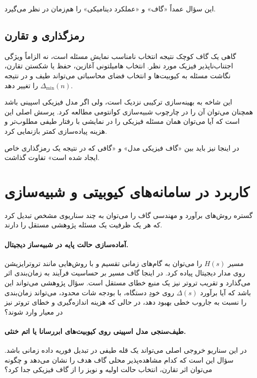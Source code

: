 این سؤال عمداً «گاف» و «عملکرد دینامیکی» را هم‌زمان در نظر می‌گیرد.

\subsection{رمزگذاری و تقارن}

گاهی یک گاف کوچک نتیجه انتخاب نامناسب نمایش مسئله است، نه الزاماً ویژگی اجتناب‌ناپذیر فیزیک مورد نظر.
انتخاب هامیلتونی آغازین، حفظ یا شکستن تقارن، نگاشت مسئله به کیوبیت‌ها و انتخاب فضای محاسباتی می‌تواند طیف و در نتیجه $\Delta_{\min}(n)$ را تغییر دهد.

این شاخه به بهینه‌سازی ترکیبی نزدیک است، ولی اگر مدل فیزیکی اسپینی باشد همچنان می‌توان آن را در چارچوب شبیه‌سازی کوانتومی مطالعه کرد.
پرسش اصلی این است که آیا می‌توان همان مسئله فیزیکی را در نمایشی با رفتار طیفی مطلوب‌تر و هزینه پیاده‌سازی کمتر بازنمایی کرد.

در اینجا نیز باید بین «گاف فیزیکی مدل» و «گافی که در نتیجه یک رمزگذاری خاص ایجاد شده است» تفاوت گذاشت.

\section{کاربرد در سامانه‌های کیوبیتی و شبیه‌سازی}

گستره روش‌های برآورد و مهندسی گاف را می‌توان به چند سناریوی مشخص تبدیل کرد که هر یک ظرفیت یک مسئله پژوهشی مستقل را دارند.

\paragraph{آماده‌سازی حالت پایه در شبیه‌ساز دیجیتال.}
مسیر $H(s)$ را می‌توان به گام‌های زمانی تقسیم و با روش‌هایی مانند تروترایزیشن روی مدار دیجیتال پیاده کرد.
در اینجا گاف مسیر بر حساسیت فرآیند به زمان‌بندی اثر می‌گذارد و تقریب تروتر نیز یک منبع خطای مستقل است.
سؤال پژوهشی می‌تواند این باشد که آیا برآورد $\Delta(s)$ روی خودِ دستگاه، با بودجه شات محدود، می‌تواند زمان‌بندی را نسبت به جاروب خطی بهبود دهد، در حالی که هزینه اندازه‌گیری و خطای تروتر نیز در معیار وارد شوند؟

\paragraph{طیف‌سنجی مدل اسپینی روی کیوبیت‌های ابررسانا یا اتم خنثی.}
در این سناریو خروجی اصلی می‌تواند یک قله طیفی در تبدیل فوریه داده زمانی باشد.
سؤال این است که کدام مشاهده‌پذیر محلی گاف هدف را نشان می‌دهد و چگونه می‌توان اثر تقارن، انتخاب حالت اولیه و نویز را از گاف فیزیکی جدا کرد؟

